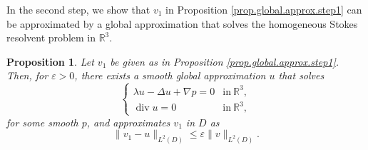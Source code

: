 \documentclass[11pt,a4paper]{article}
\numberwithin{equation}{section}
\newtheorem{proposition}[theorem]{Proposition}
{\theorembodyfont{\rmfamily}\newtheorem{remark}[theorem]{Remark}}
{\theorembodyfont{\rmfamily}\newtheorem{remarks}[theorem]{Remarks}}
\newcommand{\R}{\mathbb{R}}
\newcommand{\opdiv}{\operatorname{div}}
\newcommand{\eps}{\varepsilon}
\begin{document}
In the second step, we show that $v_1$ in Proposition \ref{prop.global.approx.step1} can be approximated by a global approximation that solves the homogeneous Stokes resolvent problem in $\R^3$. 


\begin{proposition}\label{prop.global.approx.step2}
Let $v_1$ be given as in Proposition \ref{prop.global.approx.step1}. Then, for $\eps>0$, there exists a smooth global approximation $u$ that solves 
\[
    \left\{
    \begin{array}{ll}
    \lambda u - \Delta u + \nabla p
    = 0&\mbox{in}\ \R^3, \\
    \opdiv u
    = 0&\mbox{in}\ \R^3, 
    \end{array}\right.
\]
for some smooth $p$, and approximates $v_1$ in $D$ as 
\[
    \|v_1 - u\|_{L^2(D)} 
    \le 
    \eps \|v\|_{L^2(D)}. 
\]
\end{proposition}
\end{document}
